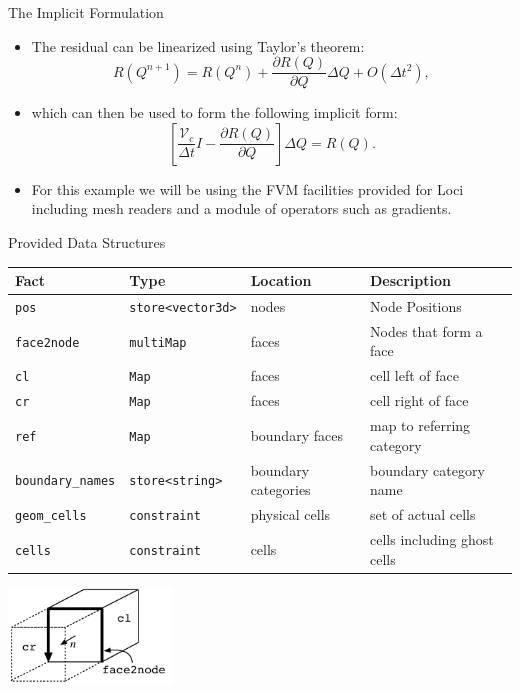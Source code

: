 \documentclass{beamer}
\begin{document}
\begin{frame}{The Implicit Formulation}
\begin{itemize}
\item The residual can be linearized using Taylor's theorem:
\begin{equation*}
R(Q^{n+1}) = R(Q^n) + \frac{\partial R(Q)}{\partial Q} \Delta Q +
O(\Delta t^2),
\end{equation*}
\item which can then be used to form the following implicit form:
\begin{equation*}
\left[ \frac{\mathcal{V}_c}{\Delta t} I - \frac{\partial R(Q)}{\partial Q}\right]\Delta Q =
R(Q).
\end{equation*}
\item For this example we will be using the FVM facilities provided for Loci including mesh readers and a module of operators such as gradients.
\end{itemize}
\end{frame}
\begin{frame}{Provided Data Structures}
\tiny
\begin{center}
  \begin{tabular}{|l|l|l|l|}
    \hline
    Fact  & Type & Location & Description\\
    \hline\hline
    {\tt pos} & {\tt store<vector3d>} & nodes & Node Positions\\
    {\tt face2node} & {\tt multiMap} & faces & Nodes that form a
    face\\
    {\tt cl} & {\tt Map} & faces & cell left of face\\
    {\tt cr} & {\tt Map} & faces & cell right of face\\
    {\tt ref} & {\tt Map} & boundary faces & map to referring category\\
    {\tt boundary\_names} & {\tt store<string>} & boundary categories & boundary category name\\
    {\tt geom\_cells} & {\tt constraint} & physical cells & set of actual cells\\
{\tt cells} & {\tt constraint} & cells & cells including ghost cells\\
    \hline
  \end{tabular}
\end{center}
\begin{center}
\includegraphics[height=1in]{face}
\end{center}
\end{frame}
\end{document}
